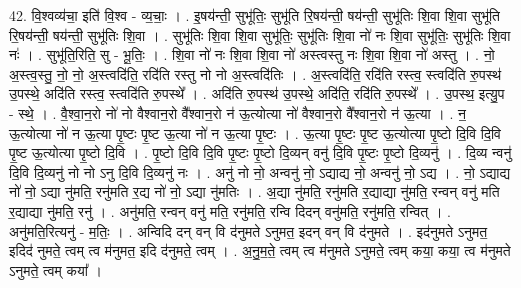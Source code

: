 \documentclass[17pt]{extarticle}
\begin{document}
42. वि॒श्वव्य॑चा॒ इति॑ वि॒श्व - व्य॒चाः॒ । . इ॒षय॑न्ती॒ सुभू॑तिः॒ सुभू॑ति रि॒षय॑न्ती॒ षय॑न्ती॒ सुभू॑तिः शि॒वा शि॒वा सुभू॑ति रि॒षय॑न्ती॒ षय॑न्ती॒ सुभू॑तिः शि॒वा । . सुभू॑तिः शि॒वा शि॒वा सुभू॑तिः॒ सुभू॑तिः शि॒वा नो॑ नः शि॒वा सुभू॑तिः॒ सुभू॑तिः शि॒वा नः॑ । . सुभू॑ति॒रिति॒ सु - भू॒तिः॒ । . शि॒वा नो॑ नः शि॒वा शि॒वा नो॑ अस्त्वस्तु नः शि॒वा शि॒वा नो॑ अस्तु । . नो॒ अ॒स्त्व॒स्तु॒ नो॒ नो॒ अ॒स्त्वदि॑ति॒ रदि॑ति रस्तु नो नो अ॒स्त्वदि॑तिः । . अ॒स्त्वदि॑ति॒ रदि॑ति रस्त्व॒ स्त्वदि॑ति रु॒पस्थ॑ उ॒पस्थे॒ अदि॑ति रस्त्व॒ स्त्वदि॑ति रु॒पस्थे᳚ । . अदि॑ति रु॒पस्थ॑ उ॒पस्थे॒ अदि॑ति॒ रदि॑ति रु॒पस्थे᳚ । . उ॒पस्थ॒ इत्यु॒प - स्थे॒ । . वै॒श्वा॒न॒रो नो॑ नो वैश्वान॒रो वै᳚श्वान॒रो न॑ ऊ॒त्योत्या नो॑ वैश्वान॒रो वै᳚श्वान॒रो न॑ ऊ॒त्या । . न॒ ऊ॒त्योत्या नो॑ न ऊ॒त्या पृ॒ष्टः पृ॒ष्ट ऊ॒त्या नो॑ न ऊ॒त्या पृ॒ष्टः । . ऊ॒त्या पृ॒ष्टः पृ॒ष्ट ऊ॒त्योत्या पृ॒ष्टो दि॒वि दि॒वि पृ॒ष्ट ऊ॒त्योत्या पृ॒ष्टो दि॒वि । . पृ॒ष्टो दि॒वि दि॒वि पृ॒ष्टः पृ॒ष्टो दि॒व्यन् वनु॑ दि॒वि पृ॒ष्टः पृ॒ष्टो दि॒व्यनु॑ । . दि॒व्य न्वनु॑ दि॒वि दि॒व्यनु॑ नो नो ऽनु दि॒वि दि॒व्यनु॑ नः । . अनु॑ नो नो॒ अन्वनु॑ नो॒ ऽद्याद्य नो॒ अन्वनु॑ नो॒ ऽद्य । . नो॒ ऽद्याद्य नो॑ नो॒ ऽद्या नु॑मति॒ रनु॑मति र॒द्य नो॑ नो॒ ऽद्या नु॑मतिः । . अ॒द्या नु॑मति॒ रनु॑मति र॒द्याद्या नु॑मति॒ रन्वन् वनु॑ मति र॒द्याद्या नु॑मति॒ रनु॑ । . अनु॑मति॒ रन्वन् वनु॑ मति॒ रनु॑मति॒ रन्वि दिदन् वनु॑मति॒ रनु॑मति॒ रन्वित् । . अनु॑मति॒रित्यनु॑ - म॒तिः॒ । . अन्विदि दन् वन् वि द॑नुमते ऽनुमत॒ इदन् वन् वि द॑नुमते । . इद॑नुमते ऽनुमत॒ इदिद॑ नुमते॒ त्वम् त्व म॑नुमत॒ इदि द॑नुमते॒ त्वम् । . अ॒नु॒म॒ते॒ त्वम् त्व म॑नुमते ऽनुमते॒ त्वम् कया॒ कया॒ त्व म॑नुमते ऽनुमते॒ त्वम् कया᳚ । \newline
\end{document}

